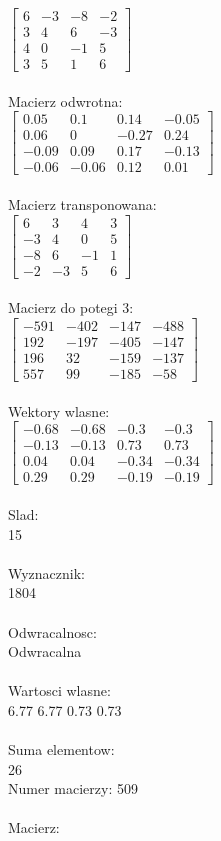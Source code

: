\documentclass[a4paper,12pt]{article}
\begin{document}
$\begin{bmatrix} 6&-3&-8&-2\\3&4&6&-3\\4&0&-1&5\\3&5&1&6 \end{bmatrix}$
\\
\\
Macierz odwrotna:\\

$\begin{bmatrix} 0.05&0.1&0.14&-0.05\\0.06&0&-0.27&0.24\\-0.09&0.09&0.17&-0.13\\-0.06&-0.06&0.12&0.01 \end{bmatrix}$
\\
\\
Macierz transponowana:\\

$\begin{bmatrix} 6&3&4&3\\-3&4&0&5\\-8&6&-1&1\\-2&-3&5&6 \end{bmatrix}$
\\
\\
Macierz do potegi 3:\\

$\begin{bmatrix} -591&-402&-147&-488\\192&-197&-405&-147\\196&32&-159&-137\\557&99&-185&-58 \end{bmatrix}$
\\
\\
Wektory wlasne:\\

$\begin{bmatrix} -0.68&-0.68&-0.3&-0.3\\-0.13&-0.13&0.73&0.73\\0.04&0.04&-0.34&-0.34\\0.29&0.29&-0.19&-0.19 \end{bmatrix}$
\\
\\
Slad:\\
15
\\
\\
Wyznacznik:\\
1804
\\
\\
Odwracalnosc:\\
Odwracalna
\\
\\
Wartosci wlasne:\\
6.77 6.77 0.73 0.73
\\
\\
Suma elementow:\\
26
\\
\newpage
Numer macierzy:
509
\\
\\
Macierz:\\
\end{document}

